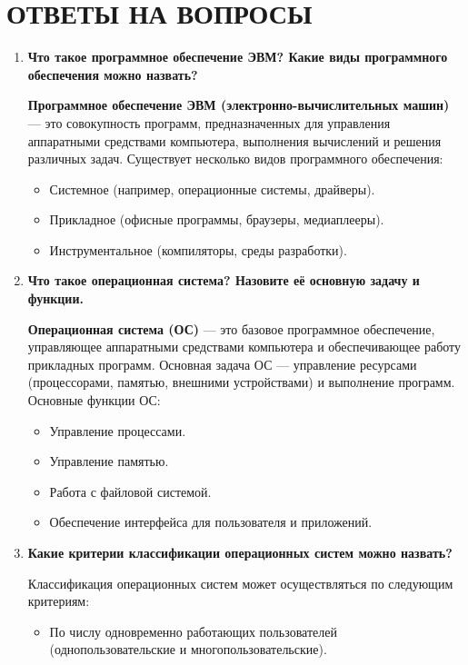 \section*{ОТВЕТЫ НА ВОПРОСЫ}

\begin{enumerate}
	\item \textbf{Что такое программное обеспечение ЭВМ?
		Какие виды программного обеспечения можно назвать?}\par
		\textbf{Программное обеспечение ЭВМ (электронно-вычислительных машин)}
		--- это совокупность программ,
		предназначенных для управления аппаратными средствами компьютера,
		выполнения вычислений и решения различных задач.
		Существует несколько видов программного обеспечения:
		\begin{itemize}
			\item Системное (например, операционные системы, драйверы).
			\item Прикладное (офисные программы, браузеры, медиаплееры).
			\item Инструментальное (компиляторы, среды разработки).
		\end{itemize}
	\item \textbf{Что такое операционная система?
		Назовите её основную задачу и функции.}\par
		\textbf{Операционная система (ОС)} --- это базовое программное
		обеспечение, управляющее аппаратными средствами компьютера
		и обеспечивающее работу прикладных программ.
		Основная задача ОС --- управление ресурсами
		(процессорами, памятью, внешними устройствами) и выполнение программ.
		Основные функции ОС:
		\begin{itemize}
			\item Управление процессами.
			\item Управление памятью.
			\item Работа с файловой системой.
			\item Обеспечение интерфейса для пользователя и приложений.
		\end{itemize}
	\item \textbf{Какие критерии классификации операционных
			систем можно назвать?}\par
		Классификация операционных систем может осуществляться
		по следующим критериям:
		\begin{itemize}
			\item По числу одновременно работающих пользователей
				(однопользовательские и многопользовательские).

\end{itemize}
\end{enumerate}
